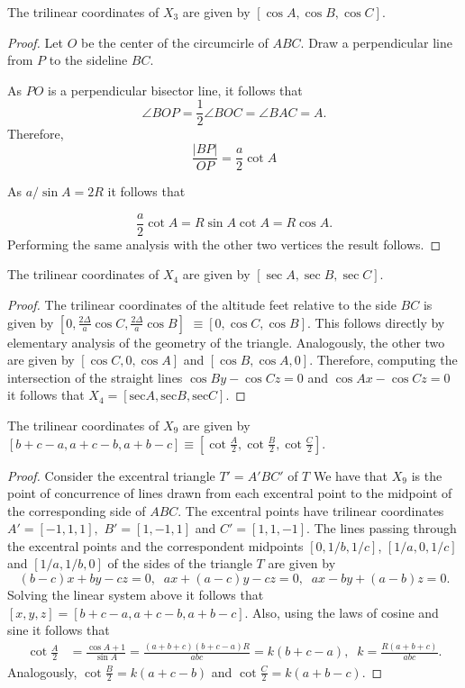 \begin{proposition}
The trilinear coordinates of $X_3$ are given by $[\cos A, \cos B, \cos C].$
\end{proposition}
\begin{proof}
Let $O$ be the center of the circumcirle of $ABC$. Draw a perpendicular line from $P$ to the sideline $BC$.
	
As $PO$ is a perpendicular bisector line, it follows that 
\[ \angle BOP=\frac{1}{2}\angle BOC=\angle BAC=A.\]
Therefore,
\[ \frac{ |BP|}{OP}=\frac{a}{2} \cot A \]

As $a/\sin A=2R$ it follows that

\[\frac{a}{2} \cot A= R\sin A\cot A= R\cos A.\]
Performing the same analysis with the other two vertices the result follows.
\end{proof}


\begin{proposition}
The trilinear coordinates of $X_4$ are given by $[\sec A, \sec B, \sec C].$
\end{proposition}
\begin{proof}
The trilinear coordinates of the altitude feet relative to the  side   $BC$  is given by
$[0,\frac{2\Delta}{a}\cos C,\frac{2\Delta}{a}\cos B]$ $   \equiv  [0, \cos C, \cos B]$.  This follows directly by elementary analysis of the geometry of the triangle.
Analogously,   the other two are given by
$[\cos C, 0, \cos A]$ and $[\cos B,\cos A, 0]$. Therefore, computing the intersection of the straight lines $\cos B y-\cos C z=0$ and $\cos A x-\cos C z=0$ it follows that
$X_4=[\mathrm{sec}{A}, \mathrm{sec}{B},\mathrm{sec}{C}].$
\end{proof}

\begin{proposition}
The trilinear coordinates of $X_9$ are given by $[b+c-a, a+c-b, a+b-c]\equiv [\cot\frac{A}{2}, \cot\frac{B}{2},\cot\frac{C}{2}].$
\end{proposition}
\begin{proof}
Consider the excentral triangle $T'=A'BC'$ of $T$
We have that $X_9$   is the point of concurrence of lines drawn from each excentral point to the midpoint of the corresponding side of $ABC$.
The excentral points have trilinear coordinates $A'=[-1,1,1],$ $B'=[1,-1,1]$ and $C'=[1,1,-1]$. The lines passing through the excentral points and the correspondent midpoints $[0,1/b,1/c]$, $[1/a,0,1/c]$ and $[1/a,1/b,0]$ of the sides of the triangle $T$ are given by
\[ (b - c)x +b y - cz=0, \;\; ax  + ( a - c)y -c z=0,\;\; ax -b y  + (a - b)z=0.\]
Solving the linear system above  it follows that
$[x,y,z]=[b+c-a,a+c-b,a+b-c].$
Also, using the laws of cosine  and sine  it follows that
\begin{align*}
\cot\frac{A}{2}&=\frac{\cos A+1}{\sin A}=\frac{(a + b + c)(b+c-a)R}{abc} =k(b+c-a),\;\; k=\frac{R(a+b+c)}{abc}.
\end{align*}
Analogously, $\cot\frac{B}{2}=k(a+c-b)$ and $\cot\frac{C}{2}=k(a+b-c)$. 
\end{proof}



